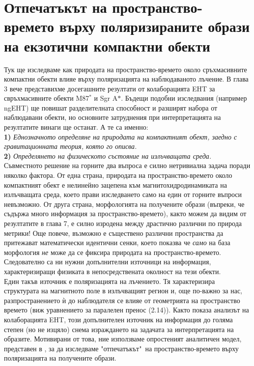 \section{Отпечатъкът на пространство-времето върху поляризираните образи на екзотични компактни обекти}
Тук ще изследваме как природата на пространство-времето около сръхмасивните компактни обекти влияе върху поляризацията на наблюдаваното лъчение. В глава 3 вече представихме досегашните резултати от колаборацията EHT за свръхмасивните обекти M87$^*$ и Sgr A$*$. Бъдещи подобни изследвания (например ngEHT) ще повишат разделителната способност и разширят набора от наблюдавани обекти, но основните затруднения при интерпретацията на резултатите винаги ще останат. А те са именно:\\

\textbf{1)} \emph{Еднозначното определяне на природата на компактният обект, заедно с гравитационната теория, която го описва.}\\

\textbf{2)} \emph{Определянето на физическото състояние на излъчващата среда.}\\

Съвместното решение на горните два въпроса е силно нетривиална задача поради няколко фактора. От една страна, природата на пространство-времето около компактният обект е нелинейно зацепена към магнитохидродинамиката на излъчващата среда, което прави изследването само на един от горните въпроси невъзможно. От друга страна, морфологията на получените образи (въпреки, че съдържа много информация за пространство-времето), както можем да видим от резултатите в глава 7, е силно изродена между драстично различни по природа метрики! Още повече, възможно е съществено различни пространства да притежават математически идентични сенки, което показва че \emph{само} на база морфология \emph{не} може да се фиксира природата на пространство-времето. Следователно са ни нужни допълнителни източници на информация, характеризиращи физиката в непосредствената околност на тези обекти. \\

Един такъв източник е поляризацията на лъчението. Тя характеризира структурата на магнитното поле в излъчващият регион и, още по-важно за нас, разпространението ѝ до наблюдателя се влияе от геометрията на пространство времето (виж уравнението за паралелен пренос (2.14)). Както показа анализът на колаборацията EHT, този допълнителен източник на информация до голяма степен (но не изцяло) снема израждането на задачата за интерпретацията на образите. Мотивирани от това, ние използваме опростеният аналитичен модел, представен в \cite{Narayan2021}, за да изследваме "отпечатъкът"$\,$ на пространство-времето върху поляризацията на получените образи.\\

